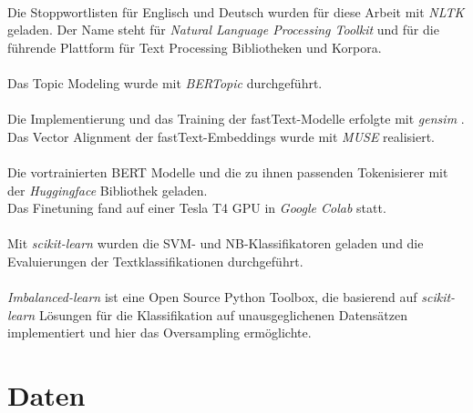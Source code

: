 \documentclass[ngerman]{ttlab-qualify}
\begin{document}
\\
Die Stoppwortlisten für Englisch und Deutsch wurden für diese Arbeit mit \textit{NLTK} \parencite{bird2009natural} geladen. Der Name steht für \textit{Natural Language Processing Toolkit} und für die führende Plattform für Text Processing Bibliotheken und Korpora.\\
\\
Das Topic Modeling wurde mit \textit{BERTopic} \parencite{bertopic} durchgeführt.\\
\\
Die Implementierung und das Training der fastText-Modelle erfolgte mit \textit{gensim} \parencite{rehurek2011gensim}. Das Vector Alignment der fastText-Embeddings wurde mit \textit{MUSE} \parencite{conneau2017word} realisiert.\\
\\
Die vortrainierten BERT Modelle und die zu ihnen passenden Tokenisierer mit der \textit{Huggingface} \parencite{Wolf_Transformers_State-of-the-Art_Natural_2020} Bibliothek geladen.\\
Das Finetuning fand auf einer Tesla T4 GPU in \textit{Google Colab} \parencite{gsuite} statt.\\
\\
Mit \textit{scikit-learn} \parencite{scikit-learn} wurden die SVM- und NB-Klassifikatoren geladen und die Evaluierungen der Textklassifikationen durchgeführt.\\
\\
\textit{Imbalanced-learn} \parencite{imbalanced_learn} ist eine Open Source Python Toolbox, die basierend auf \textit{scikit-learn} Lösungen für die Klassifikation auf unausgeglichenen Datensätzen implementiert und hier das Oversampling ermöglichte.

\section{Daten} \label{Daten}
\end{document}
